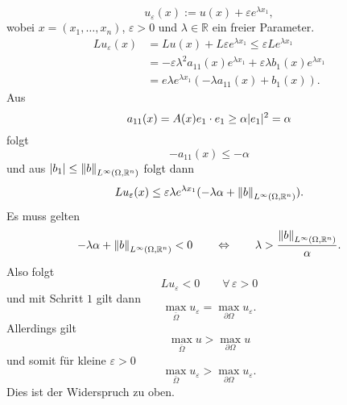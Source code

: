 \begin{beweis}
\begin{description}
		\[
			u_{\varepsilon}(x):= u(x) + \varepsilon e^{\lambda x_1},
		\]
		wobei $x = (x_1, \dots, x_n)$, $\varepsilon > 0$ und $\lambda \in \mathbb{R}$ ein freier Parameter.
		\begin{align*}
			Lu_{\varepsilon}(x) &= Lu(x) + L \varepsilon e^{\lambda x_1} \leq \varepsilon L e^{\lambda x_1} \\ 
			&= - \varepsilon \lambda^2 a_{11}(x) e^{\lambda x_1} + \varepsilon \lambda b_1(x) e^{\lambda x_1} \\
			&= e \lambda e^{\lambda x_1} ( - \lambda a_{11}(x)+ b_1(x)).
		\end{align*}
		Aus \begin{equation}
			a_{11}(x)= A(x)e_1 \cdot e_1 \geq \alpha \lvert e_1\rvert^2 = \alpha
		\end{equation}
		folgt
		\[
			-a_{11}(x) \leq -\alpha
		\]
		und aus $\abs{b_1} \leq \norm{b}_{L^{\infty}(\Omega,\mathbb{R}^n)}$ folgt dann
		\[
			Lu_{\varepsilon}(x) \leq  \varepsilon \lambda e^{\lambda x_1}(-\lambda \alpha + \norm{b}_{L^{\infty}(\Omega,\mathbb{R}^n)}).
		\]
		Es muss gelten 
		\[
			-\lambda \alpha + \norm{b}_{L^{\infty}(\Omega,\mathbb{R}^n)}<0 \qquad \Leftrightarrow \qquad \lambda > \frac{\norm{b}_{L^{\infty}(\Omega,\mathbb{R}^n)}}{\alpha}.
		\]
		Also folgt 
		\[
			Lu_{\varepsilon} < 0 \qquad \forall\, \varepsilon >0 
		\]
		und mit Schritt $1$ gilt dann
		\[
			\max_{\bar{\Omega}}u_{\varepsilon} = \max_{ \partial \Omega}u_{\varepsilon}.
		\]
		Allerdings gilt \[
			\max_{\bar{\Omega}}u > \max_{ \partial \Omega}u
		\]
		und somit für kleine $\varepsilon >0$ \[
			\max_{\bar{\Omega}}u_{\varepsilon} > \max_{ \partial \Omega}u_{\varepsilon}.
		\]
		Dies ist der Widerspruch zu oben.
 	\end{description}
\end{beweis}
